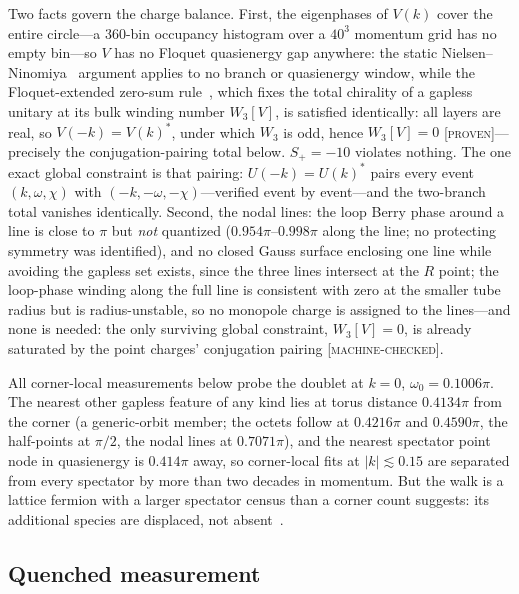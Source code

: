 \documentclass[aps,prd,twocolumn,superscriptaddress,nofootinbib,floatfix]{revtex4-2}
\newcommand{\evP}{\textnormal{\textsc{[proven]}}}
\newcommand{\evM}{\textnormal{\textsc{[machine-checked]}}}
\begin{document}
Two facts govern the charge balance. First, the eigenphases of $V(k)$
cover the entire circle---a 360-bin occupancy histogram over a $40^3$
momentum grid has no empty bin---so $V$ has no Floquet quasienergy gap
anywhere: the static Nielsen--Ninomiya~\cite{NielsenNinomiya} argument
applies to no branch or quasienergy window, while the Floquet-extended
zero-sum rule~\cite{HigashikawaUeda,BesshoSato}, which fixes the total
chirality of a gapless unitary at its bulk winding number $W_3[V]$, is
satisfied identically: all layers are real, so $V(-k)=V(k)^*$, under
which $W_3$ is odd, hence $W_3[V]=0$ \evP{}---precisely the
conjugation-pairing total below. $S_+=-10$ violates nothing. The one
exact global constraint is that pairing: $U(-k)=U(k)^*$ pairs every
event $(k,\omega,\chi)$
with $(-k,-\omega,-\chi)$---verified event by event---and the
two-branch total vanishes identically. Second, the nodal lines: the
loop Berry phase around a line is close to $\pi$ but \emph{not}
quantized ($0.954\pi$--$0.998\pi$ along the line; no protecting
symmetry was identified), and no closed Gauss surface enclosing one
line while avoiding the gapless set exists, since the three lines
intersect at the $R$ point; the loop-phase winding along the full line
is consistent with zero at the smaller tube radius but is
radius-unstable, so no monopole charge is assigned to the lines---and
none is needed: the only surviving global constraint, $W_3[V]=0$, is
already saturated by the point charges' conjugation pairing \evM{}.

All corner-local measurements below probe the doublet at $k=0$,
$\omega_0=0.1006\pi$. The nearest other gapless feature of any kind
lies at torus distance $0.4134\pi$ from the corner (a generic-orbit
member; the octets follow at $0.4216\pi$ and $0.4590\pi$, the
half-points at $\pi/2$, the nodal lines at $0.7071\pi$), and the
nearest spectator point node in quasienergy is $0.414\pi$ away, so
corner-local fits at $|k|\lesssim0.15$ are separated from every
spectator by more than two decades in momentum. But the walk is a
lattice fermion with a larger spectator census than a corner count
suggests: its additional species are displaced, not
absent~\cite{DoublingQW}.

\subsection{Quenched measurement}
\label{sec:quenchedcone}
\end{document}
